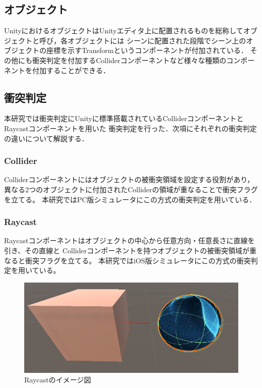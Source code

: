 \documentclass{ltjsreport}
\begin{document}
		\subsection{オブジェクト}
			UnityにおけるオブジェクトはUnityエディタ上に配置されるものを総称してオブジェクトと呼び，各オブジェクトには
			シーンに配置された段階でシーン上のオブジェクトの座標を示すTransformというコンポーネントが付加されている．
			その他にも衝突判定を付加するColliderコンポーネントなど様々な種類のコンポーネントを付加することができる．
		\subsection{衝突判定}
			本研究では衝突判定にUnityに標準搭載されているColliderコンポーネントとRaycastコンポーネントを用いた
			衝突判定を行った．次項にそれぞれの衝突判定の違いについて解説する．
			\subsubsection{Collider}
				Colliderコンポーネントにはオブジェクトの被衝突領域を設定する役割があり，
				異なる2つのオブジェクトに付加されたColliderの領域が重なることで衝突フラグを立てる。
				本研究ではPC版シミュレータにこの方式の衝突判定を用いている．

\clearpage
			\subsubsection{Raycast}
				Raycastコンポーネントはオブジェクトの中心から任意方向・任意長さに直線を引き、その直線と
				Colliderコンポーネントを持つオブジェクトの被衝突領域が重なると衝突フラグを立てる。
				本研究ではiOS版シミュレータにこの方式の衝突判定を用いている。

					\begin{figure}[H]
					\centering
					\includegraphics[width = 12cm]{../figs/raycast.png}
					\caption{Raycastのイメージ図}
					\label{fig:Raycast}
					\end{figure}
\end{document}
